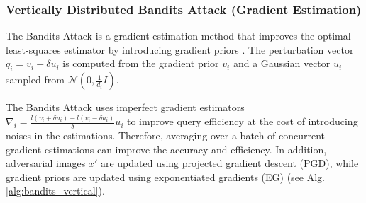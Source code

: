 
\subsubsection{Vertically Distributed Bandits Attack (Gradient Estimation)}

The Bandits Attack is a gradient estimation method that improves the optimal least-squares estimator by introducing gradient priors \citep{ilyas2018prior}. The perturbation vector $q_i=v_i+\delta u_i$ is computed from the gradient prior $v_i$ and a Gaussian vector $u_i$ sampled from $\mathcal{N}(0, \frac{1}{d_i}I)$. 

The Bandits Attack uses imperfect gradient estimators $\nabla_i= \frac{l(v_i+\delta u_i)-l(v_i-\delta u_i)}{\delta} u_i$ to improve query efficiency at the cost of introducing noises in the estimations. Therefore, averaging over a batch of concurrent gradient estimations can improve the accuracy and efficiency. In addition, adversarial images $x'$ are updated using projected gradient descent (PGD), while gradient priors are updated using exponentiated gradients (EG) \citep{pmlr-v117-ghai20a} (see Alg. \ref{alg:bandits_vertical}).




